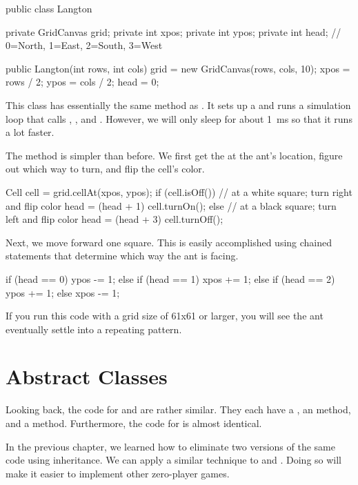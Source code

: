 \begin{code}
public class Langton {
    private GridCanvas grid;
    private int xpos;
    private int ypos;
    private int head; // 0=North, 1=East, 2=South, 3=West

    public Langton(int rows, int cols) {
        grid = new GridCanvas(rows, cols, 10);
        xpos = rows / 2;
        ypos = cols / 2;
        head = 0;
    }
}
\end{code}

This class has essentially the same  method as .
It sets up a  and runs a simulation loop that calls , , and .
However, we will only sleep for about 1~ms so that it runs a lot faster.

The  method is simpler than before.
We first get the  at the ant's location, figure out which way to turn, and flip the cell's color.

\begin{code}
Cell cell = grid.cellAt(xpos, ypos);
if (cell.isOff()) {
    // at a white square; turn right and flip color
    head = (head + 1) %
    cell.turnOn();
} else {
    // at a black square; turn left and flip color
    head = (head + 3) %
    cell.turnOff();
}
\end{code}

Next, we move forward one square.
This is easily accomplished using chained  statements that determine which way the ant is facing.

\begin{code}
if (head == 0) {
    ypos -= 1;
} else if (head == 1) {
    xpos += 1;
} else if (head == 2) {
    ypos += 1;
} else {
    xpos -= 1;
}
\end{code}

If you run this code with a grid size of 61x61 or larger, you will see the ant eventually settle into a repeating pattern.


\section{Abstract Classes}

Looking back, the code for  and  are rather similar.
They each have a , an  method, and a  method.
Furthermore, the code for  is almost identical.

In the previous chapter, we learned how to eliminate two versions of the same code using inheritance.
We can apply a similar technique to  and .
Doing so will make it easier to implement other zero-player games.

